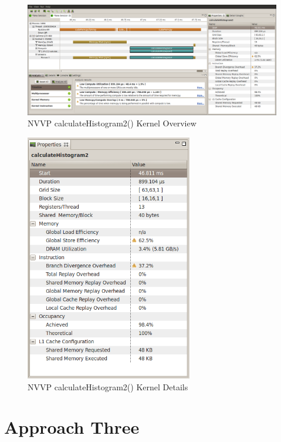 \documentclass{article}
\begin{document}
\begin{figure}
\centering
\includegraphics[width=1.0\textwidth]{screenshots/nvvp/calculateHistogram2_screen1.png}
\caption{NVVP calculateHistogram2() Kernel Overview }
\label{kernel2nvvp1}
\end{figure}

\begin{figure}
\centering
\includegraphics[width=0.65\textwidth]{screenshots/nvvp/calculateHistogram2_screen3.png}
\caption{NVVP calculateHistogram2() Kernel Details}
\label{kernel2nvvp3}
\end{figure}

\section{Approach Three}\label{approach3}
\end{document}

